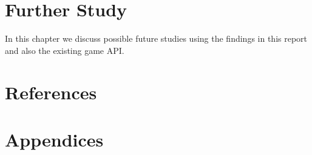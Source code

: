 \documentclass{bhamthesis}
\theoremstyle{definition}
\begin{document}
\chapter{Further Study}
In this chapter we discuss possible future studies using the findings in this report and also the existing game API.



\backmatter
\chapter{References}
\printbibliography[heading=none]
%
%

\chapter{Appendices}
\end{document}
